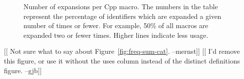 \documentclass[10pt]{article}
\newcommand{\pkg}[1]{\textsf{#1}}
\newcommand{\captionsmall}[1]{\caption[]{\small #1}}
\begin{document}




\begin{figure}
\centerline{}
\captionsmall{Number of expansions per Cpp macro.  The numbers in the
  table represent the percentage of identifiers which are expanded a given
  number of times or fewer.  For example, 50\% of all
  macros are expanded two or fewer times. Higher lines indicate less usage.}
\label{fig:freq-use-cat}
\end{figure}


[[ Not sure what to say about Figure~\ref{fig:freq-sum-cat}. --mernst]]
[[ I'd remove this figure, or use it without the uses column instead of
the distinct definitions figure. --gjb]]
\end{document}
